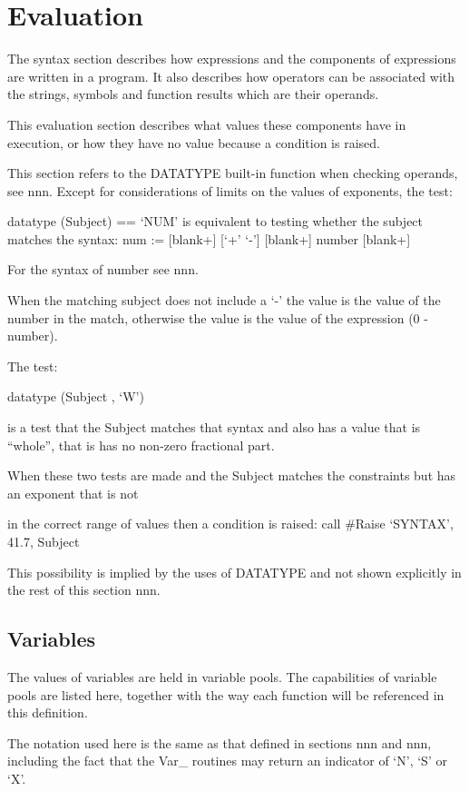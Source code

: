 \chapter{Evaluation}\label{evaluation}

The syntax section describes how expressions and the components of
expressions are written in a program. It also describes how operators
can be associated with the strings, symbols and function results which
are their operands.

This evaluation section describes what values these components have in
execution, or how they have no value because a condition is raised.

This section refers to the DATATYPE built-in function when checking
operands, see nnn. Except for considerations of limits on the values of
exponents, the test:

datatype (Subject) == `NUM' is equivalent to testing whether the subject
matches the syntax: num := {[}blank+{]} {[}`+' \textbar{} `-'{]}
{[}blank+{]} number {[}blank+{]}

For the syntax of number see nnn.

When the matching subject does not include a `-' the value is the value
of the number in the match, otherwise the value is the value of the
expression (0 - number).

The test:

datatype (Subject , `W')

is a test that the Subject matches that syntax and also has a value that
is ``whole'', that is has no non-zero fractional part.

When these two tests are made and the Subject matches the constraints
but has an exponent that is not

in the correct range of values then a condition is raised: call \#Raise
`SYNTAX', 41.7, Subject

This possibility is implied by the uses of DATATYPE and not shown
explicitly in the rest of this section nnn.

\section{Variables}\label{variables}

The values of variables are held in variable pools. The capabilities of
variable pools are listed here, together with the way each function will
be referenced in this definition.

The notation used here is the same as that defined in sections nnn and
nnn, including the fact that the Var\_ routines may return an indicator
of `N', `S' or `X'.

